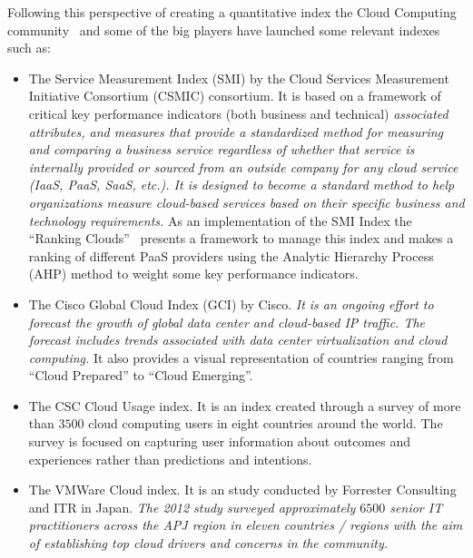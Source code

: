 Following this perspective of creating a quantitative index the Cloud Computing community~\cite{Maiya:2012:QMC:2353730.2353862,DBLP:conf/quatic/KlemsBW12} 
and some of the big players have launched some relevant indexes such as:

\begin{itemize}
 \item The Service Measurement Index (SMI) by the Cloud Services Measurement Initiative Consortium (CSMIC) consortium. It is 
 based on a framework of critical key performance indicators (both business and technical) \textit{associated attributes, and measures 
 that provide a standardized method for measuring and comparing a business service regardless of whether that service is internally provided or sourced from an outside company for any cloud service (IaaS, PaaS, SaaS, etc.). It is designed to become a 
 standard method to help organizations measure cloud-based services based on their specific business and technology requirements.} As 
 an implementation of the SMI Index the ``Ranking Clouds''~\cite{DBLP:journals/fgcs/GargVB13} presents a framework to manage this index 
 and makes a ranking of different PaaS providers using the Analytic Hierarchy Process (AHP) method to weight some key performance indicators.
 
 \item The Cisco Global Cloud Index (GCI) by Cisco. \textit{It is an ongoing effort to forecast the growth of global data 
 center and cloud-based IP traffic. The forecast includes trends associated with data center virtualization and cloud computing. }
 It also provides a visual representation of countries ranging  from ``Cloud Prepared'' to ``Cloud Emerging''.

 \item The CSC Cloud Usage index. It is an index created through a survey of more than $3500$ cloud computing users 
 in eight countries around the world. The survey is focused on capturing user information about outcomes and 
 experiences rather than predictions and intentions.

 \item The VMWare Cloud index. It is an study conducted by Forrester Consulting and ITR in Japan. \textit{The 2012 study surveyed 
 approximately $6500$ senior IT practitioners across the APJ region in eleven countries / regions with the aim of establishing 
 top cloud drivers and concerns in the community.}

\end{itemize}

